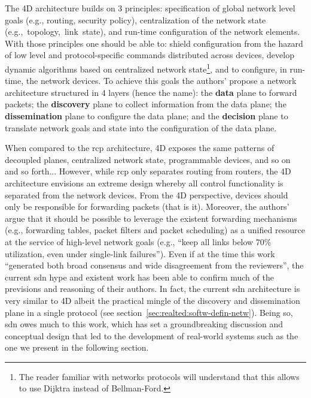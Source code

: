 The 4D architecture builds on 3 principles: specification of global network level goals (e.g., routing, security policy),  centralization of the network state \mbox{(e.g.,\ topology, link state),} and run-time configuration  of the network elements. 
With those principles one should be able to: shield configuration from the hazard of low level and protocol-specific commands distributed across devices, develop dynamic algorithms based on centralized network state\footnote{The reader familiar with networks protocols will  understand that this allows to use Dijktra instead of Bellman-Ford.}, and  to configure, in run-time, the network devices.  
To achieve this goals the authors' propose a network architecture structured in 4 layers (hence the name): the \textbf{data} plane to forward packets; the \textbf{discovery} plane to collect information from the data plane; the \textbf{dissemination}  plane to configure the data plane; and the \textbf{decision} plane to translate network goals and state into the configuration of the data plane. 

When compared to the \gls{rcp} architecture, 4D exposes the same patterns of decoupled planes, centralized network state, programmable devices, and so on and so forth... 
However, while \gls{rcp} only separates routing from routers, the 4D architecture envisions an extreme design whereby all control functionality is separated from the network devices. From the 4D perspective, devices should only be responsible for forwarding packets (that is it). Moreover, the authors' argue that it should be possible to leverage the existent forwarding mechanisms (e.g., forwarding tables, packet filters and packet scheduling) as a unified resource at the service of high-level network goals  (e.g., ``keep all links below 70\% utilization, even under single-link failures'').
Even if at the time this work ``generated both broad consensus and wide disagreement from the reviewers'', the current \gls{sdn} hype and existent work has been able to confirm much of the previsions and reasoning of their authors. 
In fact, the current \gls{sdn} architecture is very similar to 4D albeit the practical mingle of the discovery and dissemination plane in a single protocol (see section~\ref{sec:realted:softw-defin-netw}). Being so, \gls{sdn} owes much to this work, which has set a groundbreaking discussion and conceptual design that led to the development of real-world systems such as the one we present in the following section.  

